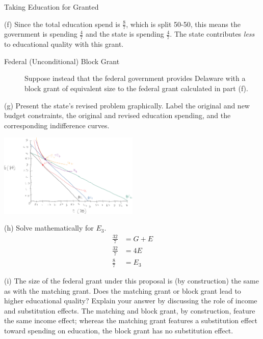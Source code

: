 \documentclass[8pt]{extarticle}
\begin{document}
\begin{problem}{Taking Education for Granted}
\begin{problem}{(f)}
      Since the total education spend is $\frac{8}{7}$, which is split 50-50, this means the government is spending $\frac{4}{7}$ and the state is spending $\frac{4}{7}$. The state contributes \textit{less} to educational quality with this grant.
    \end{problem}
    \begin{description}
      \item[Federal (Unconditional) Block Grant] Suppose instead that the federal government provides Delaware with a block grant of equivalent size to the federal grant calculated in part (f).
    \end{description}
    \begin{problem}{(g)}
      Present the state's revised problem graphically. Label the original and new budget constraints, the original and revised education spending, and the corresponding indifference curves.
      \tcblower
      \begin{center}
        \includegraphics[width=0.5\textwidth]{images/3_4_g.png}
      \end{center}
    \end{problem}
    \begin{problem}{(h)}
      Solve mathematically for $E_3$.
      \tcblower
      \begin{align*}
        \frac{32}{7} &= G + E \\
      \frac{32}{7} &= 4E\\
      \frac{8}{7} &= E_3
      \end{align*}
    \end{problem}
    \begin{problem}{(i)}
      The size of the federal grant under this proposal is (by construction) the same as with the matching grant. Does the matching grant or block grant lead to higher educational quality? Explain your answer by discussing the role of income and substitution effects.
      \tcblower
      The matching and block grant, by construction, feature the same income effect; whereas the matching grant features a substitution effect toward spending on education, the block grant has no substitution effect.

\end{problem}
\end{problem}
\end{document}
